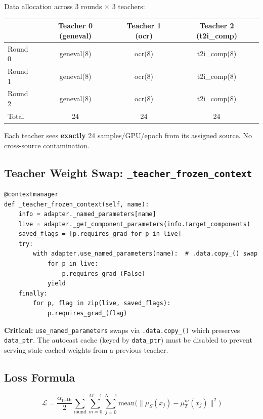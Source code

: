 \documentclass[11pt]{article}
\begin{document}
Data allocation across 3 rounds $\times$ 3 teachers:
\begin{center}
\begin{tabular}{lccc}
\toprule
 & Teacher 0 (geneval) & Teacher 1 (ocr) & Teacher 2 (t2i\_comp) \\
\midrule
Round 0 & geneval(8) & ocr(8) & t2i\_comp(8) \\
Round 1 & geneval(8) & ocr(8) & t2i\_comp(8) \\
Round 2 & geneval(8) & ocr(8) & t2i\_comp(8) \\
\midrule
Total & 24 & 24 & 24 \\
\bottomrule
\end{tabular}
\end{center}

Each teacher sees \textbf{exactly} 24 samples/GPU/epoch from its assigned source. No cross-source contamination.

\subsection{Teacher Weight Swap: \texttt{\_teacher\_frozen\_context}}

\begin{lstlisting}
@contextmanager
def _teacher_frozen_context(self, name):
    info = adapter._named_parameters[name]
    live = adapter._get_component_parameters(info.target_components)
    saved_flags = [p.requires_grad for p in live]
    try:
        with adapter.use_named_parameters(name):  # .data.copy_() swap
            for p in live:
                p.requires_grad_(False)
            yield
    finally:
        for p, flag in zip(live, saved_flags):
            p.requires_grad_(flag)
\end{lstlisting}

\textbf{Critical:} \texttt{use\_named\_parameters} swaps via \texttt{.data.copy\_()} which preserves \texttt{data\_ptr}. The autocast cache (keyed by \texttt{data\_ptr}) must be disabled to prevent serving stale cached weights from a previous teacher.

\subsection{Loss Formula}

\begin{equation}
\mathcal{L} = \frac{\alpha_\text{path}}{2} \sum_{\text{round}} \sum_{m=0}^{M-1} \sum_{j=0}^{N-1} \text{mean}\bigl(\|\mu_S(x_j) - \mu_T^m(x_j)\|^2\bigr)
\end{equation}
\end{document}
